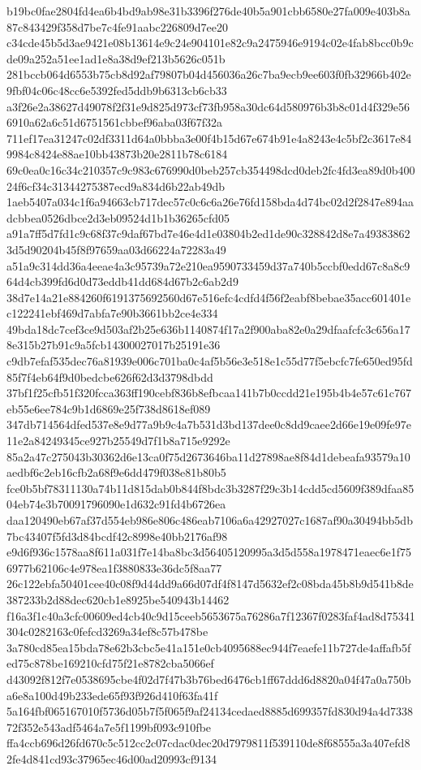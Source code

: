 \documentclass[11pt,a4paper]{article}
\begin{document}
{b19bc0fae2804fd4ea6b4bd9ab98e31b3396f276de40b5a901cbb6580e27fa009e403b8a87c843429f358d7be7c4fe91aabc226809d7ee20
c34cde45b5d3ae9421e08b13614e9c24e904101e82c9a2475946e9194c02e4fab8bcc0b9cde09a252a51ee1ad1e8a38d9ef213b5626c051b
281bccb064d6553b75cb8d92af79807b04d456036a26c7ba9ecb9ee603f0fb32966b402e9fbf04c06c48cc6e5392fed5ddb9b6313cb6cb33
a3f26e2a38627d49078f2f31e9d825d973cf73fb958a30dc64d580976b3b8c01d4f329e566910a62a6c51d6751561cbbef96aba03f67f32a
711ef17ea31247c02df3311d64a0bbba3e00f4b15d67e674b91e4a8243e4c5bf2c3617e849984c8424e88ae10bb43873b20e2811b78c6184
69c0ea0c16c34c210357c9c983c676990d0beb257cb354498dcd0deb2fc4fd3ea89d0b40024f6cf34c31344275387ecd9a834d6b22ab49db
1aeb5407a034c1f6a94663cb717dec57c0c6c6a26e76fd158bda4d74bc02d2f2847e894aadcbbea0526dbce2d3eb09524d1b1b36265cfd05
a91a7ff5d7fd1c9c68f37c9daf67bd7e46e4d1e03804b2ed1de90c328842d8e7a493838623d5d90204b45f8f97659aa03d66224a72283a49
a51a9c314dd36a4eeae4a3c95739a72e210ea9590733459d37a740b5ccbf0edd67c8a8c964d4cb399fd6d0d73eddb41dd684d67b2c6ab2d9
38d7e14a21e884260f6191375692560d67e516efc4cdfd4f56f2eabf8bebae35acc601401ec122241ebf469d7abfa7e90b3661bb2ce4e334
49bda18dc7cef3ce9d503af2b25e636b1140874f17a2f900aba82e0a29dfaafcfc3c656a178e315b27b91c9a5fcb14300027017b25191e36
c9db7efaf535dec76a81939e006c701ba0c4af5b56e3e518e1c55d77f5ebcfc7fe650ed95fd85f7f4eb64f9d0bedcbe626f62d3d3798dbdd
37bf1f25cfb51f320fcca363ff190cebf836b8efbcaa141b7b0ccdd21e195b4b4e57c61c767eb55e6ee784c9b1d6869e25f738d8618ef089
347db714564dfed537e8e9d77a9b9c4a7b531d3bd137dee0c8dd9caee2d66e19e09fe97e11e2a84249345ce927b25549d7f1b8a715e9292e
85a2a47c275043b30362d6e13ca0f75d2673646ba11d27898ae8f84d1debeafa93579a10aedbf6c2eb16cfb2a68f9e6dd479f038e81b80b5
fce0b5bf78311130a74b11d815dab0b844f8bdc3b3287f29c3b14cdd5cd5609f389dfaa8504eb74e3b70091796090e1d632c91fd4b6726ea
daa120490eb67af37d554eb986e806c486eab7106a6a42927027c1687af90a30494bb5db7bc43407f5fd3d84bcdf42c8998e40bb2176af98
e9d6f936c1578aa8f611a031f7e14ba8bc3d56405120995a3d5d558a1978471eaec6e1f756977b62106c4e978ea1f3880833e36dc5f8aa77
26c122ebfa50401cee40c08f9d44dd9a66d07df4f8147d5632ef2c08bda45b8b9d541b8de387233b2d88dec620cb1e8925be540943b14462
f16a3f1c40a3cfc00609ed4cb40c9d15ceeb5653675a76286a7f12367f0283faf4ad8d75341304c0282163c0fefcd3269a34ef8c57b478be
3a780cd85ea15bda78e62b3cbc5e41a151e0cb4095688ec944f7eaefe11b727de4affafb5fed75c878be169210cfd75f21e8782cba5066ef
d43092f812f7e0538695cbe4f02d7f47b3b76bed6476cb1ff67ddd6d8820a04f47a0a750ba6e8a100d49b233ede65f93f926d410f63fa41f
5a164fbf065167010f5736d05b7f5f065f9af24134cedaed8885d699357fd830d94a4d733872f352e543adf5464a7e5f1199bf093c910fbe
ffa4ccb696d26fd670c5c512cc2c07cdac0dec20d7979811f539110de8f68555a3a407efd82fe4d841cd93c37965ec46d00ad20993cf9134
}
\end{document}

